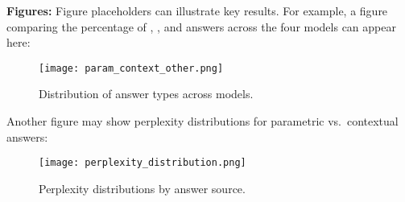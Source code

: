 \textbf{Figures:}
Figure placeholders can illustrate key results. For example, a figure comparing the percentage of \Parametric{}, \Contextual{}, and \Other{} answers across the four models can appear here:
\begin{figure}[h]
\centering
\texttt{[image: param\_context\_other.png]}
\caption{Distribution of answer types across models.}
\label{fig:answer_distribution}
\end{figure}

Another figure may show perplexity distributions for parametric vs.\ contextual answers:
\begin{figure}[h]
\centering
\texttt{[image: perplexity\_distribution.png]}
\caption{Perplexity distributions by answer source.}
\label{fig:perplexity_distribution}
\end{figure}


